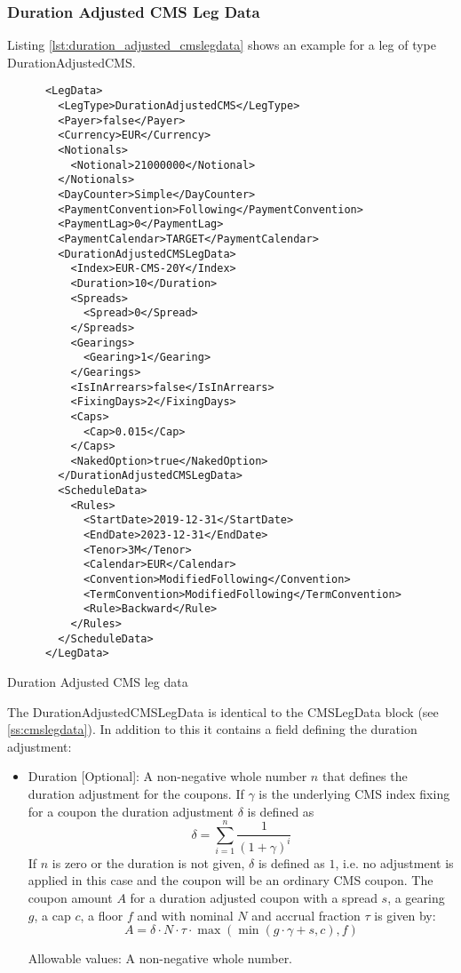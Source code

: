 \subsubsection{Duration Adjusted CMS Leg Data}
\label{ss:duration_adjusted_cmslegdata}

Listing \ref{lst:duration_adjusted_cmslegdata} shows an example for a leg of type DurationAdjustedCMS.

\begin{listing}[H]
\begin{verbatim}
      <LegData>
        <LegType>DurationAdjustedCMS</LegType>
        <Payer>false</Payer>
        <Currency>EUR</Currency>
        <Notionals>
          <Notional>21000000</Notional>
        </Notionals>
        <DayCounter>Simple</DayCounter>
        <PaymentConvention>Following</PaymentConvention>
        <PaymentLag>0</PaymentLag>
        <PaymentCalendar>TARGET</PaymentCalendar>
        <DurationAdjustedCMSLegData>
          <Index>EUR-CMS-20Y</Index>
          <Duration>10</Duration>
          <Spreads>
            <Spread>0</Spread>
          </Spreads>
          <Gearings>
            <Gearing>1</Gearing>
          </Gearings>
          <IsInArrears>false</IsInArrears>
          <FixingDays>2</FixingDays>
          <Caps>
            <Cap>0.015</Cap>
          </Caps>
          <NakedOption>true</NakedOption>
        </DurationAdjustedCMSLegData>
        <ScheduleData>
          <Rules>
            <StartDate>2019-12-31</StartDate>
            <EndDate>2023-12-31</EndDate>
            <Tenor>3M</Tenor>
            <Calendar>EUR</Calendar>
            <Convention>ModifiedFollowing</Convention>
            <TermConvention>ModifiedFollowing</TermConvention>
            <Rule>Backward</Rule>
          </Rules>
        </ScheduleData>
      </LegData>
\end{verbatim}
\caption{Duration Adjusted CMS leg data}
\label{lst:duration_adjusted_cmslegdata}
\end{listing}

The DurationAdjustedCMSLegData is identical to the CMSLegData block (see \ref{ss:cmslegdata}). In addition to this it
contains a field defining the duration adjustment:

\begin{itemize}
\item Duration [Optional]: A non-negative whole number $n$ that defines the duration adjustment for the coupons. If $\gamma$ is
  the underlying CMS index fixing for a coupon the duration adjustment $\delta$ is defined as
  $$\delta = \sum_{i=1}^n \frac{1}{(1+\gamma)^i}$$
  If $n$ is zero or the duration is not given, $\delta$ is defined as $1$, i.e. no adjustment is applied in this case and the
  coupon will be an ordinary CMS coupon. The coupon amount $A$ for a duration adjusted coupon with a spread $s$, a gearing
  $g$, a cap $c$, a floor $f$ and with nominal $N$ and accrual fraction $\tau$ is given by:
  $$A = \delta \cdot N \cdot \tau \cdot \max( \min( g \cdot \gamma + s, c ), f ) $$

  Allowable values:  A non-negative whole number.

\end{itemize}
